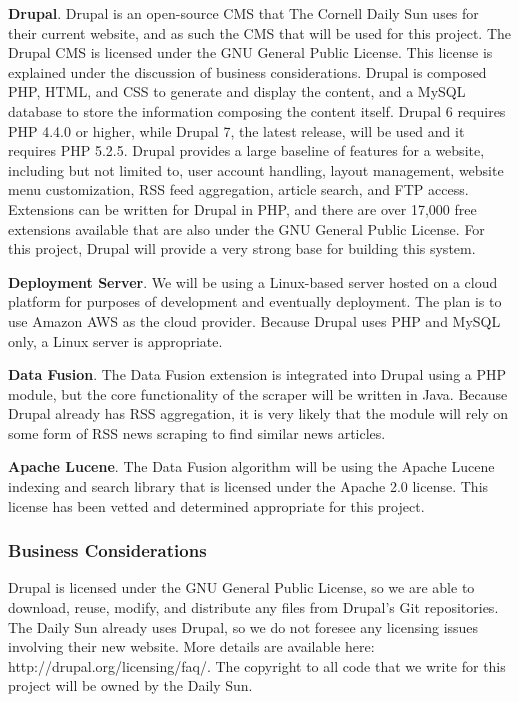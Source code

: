 \documentclass[10pt]{article} %
\begin{document}
\textbf{Drupal}. Drupal is an open-source CMS that The Cornell Daily Sun uses for their current website, and as such the CMS that will be used for this project. The Drupal CMS is licensed under the GNU General Public License. This license is explained under the discussion of business considerations. Drupal is composed PHP, HTML, and CSS to generate and display the content, and a MySQL database to store the information composing the content itself. Drupal 6 requires PHP 4.4.0 or higher, while Drupal 7, the latest release, will be used and it requires PHP 5.2.5. Drupal provides a large baseline of features for a website, including but not limited to, user account handling, layout management, website menu customization, RSS feed aggregation, article search, and FTP access. Extensions can be written for Drupal in PHP, and there are over 17,000 free extensions available that are also under the GNU General Public License. For this project, Drupal will provide a very strong base for building this system.

\textbf{Deployment Server}. We will be using a Linux-based server hosted on a cloud platform for purposes of development and eventually deployment. The plan is to use Amazon AWS as the cloud provider. Because Drupal uses PHP and MySQL only, a Linux server is appropriate.

\textbf{Data Fusion}. The Data Fusion extension is integrated into Drupal using a PHP module, but the core functionality of the scraper will be written in Java. Because Drupal already has RSS aggregation, it is very likely that the module will rely on some form of RSS news scraping to find similar news articles.

\textbf{Apache Lucene}. The Data Fusion algorithm will be using the Apache Lucene indexing and search library that is licensed under the Apache 2.0 license. This license has been vetted and determined appropriate for this project.
                    
\subsubsection{Business Considerations}

Drupal is licensed under the GNU General Public License, so we are able to download, reuse, modify, and distribute any files from Drupal’s Git repositories. The Daily Sun already uses Drupal, so we do not foresee any licensing issues involving their new website. More details are available here: http://drupal.org/licensing/faq/. The copyright to all code that we write for this project will be owned by the Daily Sun.
\end{document}
